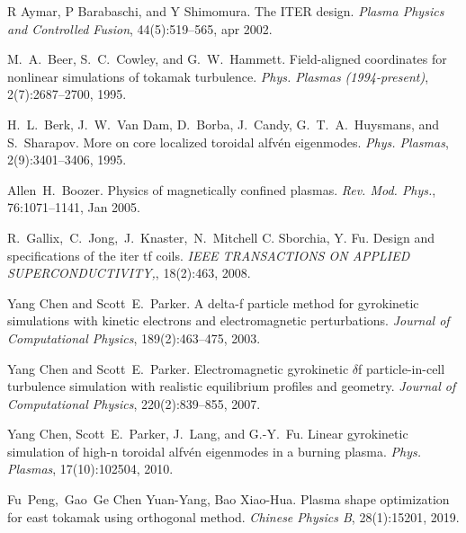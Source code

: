 \documentclass{article}
\newcommand{\tmtextit}[1]{{\itshape{#1}}}
\begin{document}
\begin{thebibliography}{10}
  R Aymar, P Barabaschi, and  Y Shimomura.
  {\newblock}The ITER design. {\newblock}\tmtextit{Plasma Physics and
  Controlled Fusion}, 44(5):519--565, apr 2002.{\newblock}
  
  M.~A.~Beer, S.~C.~Cowley, and  G.~W.~Hammett.
  {\newblock}Field-aligned coordinates for nonlinear simulations of tokamak
  turbulence. {\newblock}\tmtextit{Phys. Plasmas (1994-present)},
  2(7):2687--2700, 1995.{\newblock}
  
  H.~L.~Berk, J.~W.~Van Dam, D.~Borba, J.~Candy,
  G.~T.~A.~Huysmans, and  S.~Sharapov. {\newblock}More on core localized
  toroidal alfv{\'e}n eigenmodes. {\newblock}\tmtextit{Phys. Plasmas},
  2(9):3401--3406, 1995.{\newblock}
  
  Allen~H.~Boozer. {\newblock}Physics of magnetically
  confined plasmas. {\newblock}\tmtextit{Rev. Mod. Phys.}, 76:1071--1141, Jan
  2005.{\newblock}
  
  R.~Gallix,~C.~Jong,~J.~Knaster,~N.~Mitchell C.
  Sborchia, Y. Fu. {\newblock}Design and specifications of the iter tf coils.
  {\newblock}\tmtextit{IEEE TRANSACTIONS ON APPLIED SUPERCONDUCTIVITY,},
  18(2):463, 2008.{\newblock}
  
  Yang Chen  and  Scott~E.~Parker. {\newblock}A delta-f
  particle method for gyrokinetic simulations with kinetic electrons and
  electromagnetic perturbations. {\newblock}\tmtextit{Journal of Computational
  Physics}, 189(2):463--475, 2003.{\newblock}
  
  Yang Chen  and  Scott~E.~Parker.
  {\newblock}Electromagnetic gyrokinetic $\delta$f particle-in-cell turbulence
  simulation with realistic equilibrium profiles and geometry.
  {\newblock}\tmtextit{Journal of Computational Physics}, 220(2):839--855,
  2007.{\newblock}
  
  Yang Chen, Scott~E.~Parker, J.~Lang, and  G.-Y.~Fu.
  {\newblock}Linear gyrokinetic simulation of high-n toroidal alfv{\'e}n
  eigenmodes in a burning plasma. {\newblock}\tmtextit{Phys. Plasmas},
  17(10):102504, 2010.{\newblock}
  
  Fu~Peng,~Gao~Ge Chen Yuan-Yang, Bao Xiao-Hua.
  {\newblock}Plasma shape optimization for east tokamak using orthogonal
  method. {\newblock}\tmtextit{Chinese Physics B}, 28(1):15201,
  2019.{\newblock}
  

\end{thebibliography}
\end{document}
